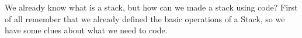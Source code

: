 We already know what is a stack, but how can we made a stack using code? First of all remember that we already defined the basic operations of a Stack, so we have some clues about what we need to code.

